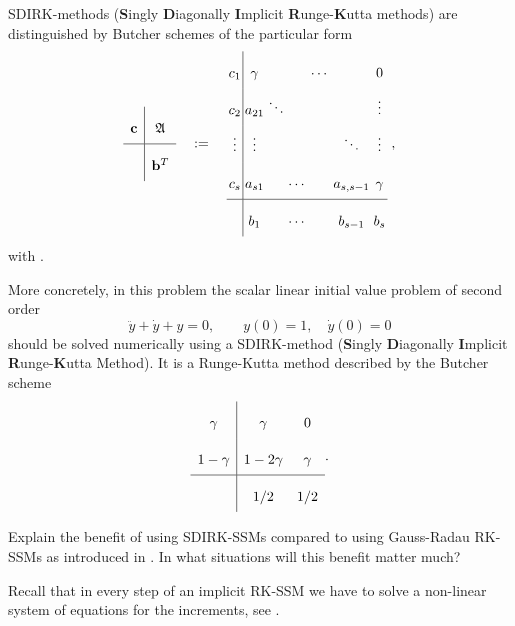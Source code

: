 \begin{problem}\label{prb:sdirk} 
  SDIRK-methods (\textbf{S}ingly \textbf{D}iagonally
  \textbf{I}mplicit \textbf{R}unge-\textbf{K}utta methods) are distinguished by
  Butcher schemes of the particular form
  \begin{gather}
    \label{eq:BSexpl}
    \begin{array}[c]{c|c}
      \Vc & \FA \\\hline
          & \Vb^{T}
    \end{array} \quad:= \quad
    \arraycolsep=1.4pt\def\arraystretch{2.2}
    \begin{array}[c]{c|cccccc}
      c_{1} & \gamma  & & & \cdots & & 0 \\
      c_{2} & a_{21} & \ddots &&&& \vdots \\
      \vdots & \vdots &&&& \ddots & \vdots \\
      c_{s} & a_{s1} && \cdots & & a_{s,s-1} & \gamma \\\hline
            & b_{1} && \cdots && b_{s-1} & b_{s}
    \end{array}\;,
\end{gather}  
with . 

More concretely, in this problem the scalar linear initial value problem of second
order
\begin{equation} \label{eq:awp}
  \ddot{y} + \dot{y} + y = 0,
  \qquad
  y(0)=1,
  \quad
  \dot{y}(0) = 0
\end{equation}
should be solved numerically using a SDIRK-method (\textbf{S}ingly \textbf{D}iagonally
\textbf{I}mplicit \textbf{R}unge-\textbf{K}utta Method).
It is a Runge-Kutta method described by the Butcher scheme
\begin{gather}\label{eq:1}
  \begin{array}{c|cc}
    \gamma & \gamma & 0 \\
    1-\gamma & 1-2\gamma & \gamma \\\hline
    & 1/2 & 1/2\rule{0pt}{2.2ex}
  \end{array}.
\end{gather}
%

\begin{subproblem}[1]\label{sp:0}
  Explain the benefit of using SDIRK-SSMs compared to using Gauss-Radau RK-SSMs as
  introduced in . In what situations will this benefit matter much? 

  \begin{hint}
    Recall that in every step of an implicit RK-SSM we have to solve a non-linear
    system of equations for the increments, see . 
  \end{hint}
\end{subproblem}


\end{problem}
